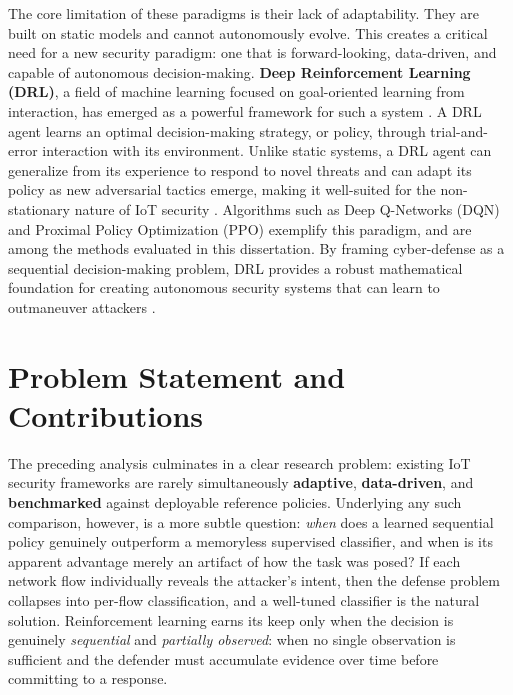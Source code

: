 The core limitation of these paradigms is their lack of adaptability. They are built on static models and cannot autonomously evolve. This creates a critical need for a new security paradigm: one that is forward-looking, data-driven, and capable of autonomous decision-making. \textbf{Deep Reinforcement Learning (DRL)}, a field of machine learning focused on goal-oriented learning from interaction, has emerged as a powerful framework for such a system \cite{Chen2021}. A DRL agent learns an optimal decision-making strategy, or policy, through trial-and-error interaction with its environment. Unlike static systems, a DRL agent can generalize from its experience to respond to novel threats and can adapt its policy as new adversarial tactics emerge, making it well-suited for the non-stationary nature of IoT security \cite{Sutton2018,Uprety2021}. Algorithms such as Deep Q-Networks (DQN) \cite{Mnih2015} and Proximal Policy Optimization (PPO) \cite{Schulman2017} exemplify this paradigm, and are among the methods evaluated in this dissertation. By framing cyber-defense as a sequential decision-making problem, DRL provides a robust mathematical foundation for creating autonomous security systems that can learn to outmaneuver attackers \cite{Gueriani2023}.

\section{Problem Statement and Contributions}\label{sec:proposal_and_contributions}
The preceding analysis culminates in a clear research problem: existing IoT security frameworks are rarely simultaneously \textbf{adaptive}, \textbf{data-driven}, and \textbf{benchmarked} against deployable reference policies. Underlying any such comparison, however, is a more subtle question: \emph{when} does a learned sequential policy genuinely outperform a memoryless supervised classifier, and when is its apparent advantage merely an artifact of how the task was posed? If each network flow individually reveals the attacker's intent, then the defense problem collapses into per-flow classification, and a well-tuned classifier is the natural solution. Reinforcement learning earns its keep only when the decision is genuinely \emph{sequential} and \emph{partially observed}: when no single observation is sufficient and the defender must accumulate evidence over time before committing to a response.

